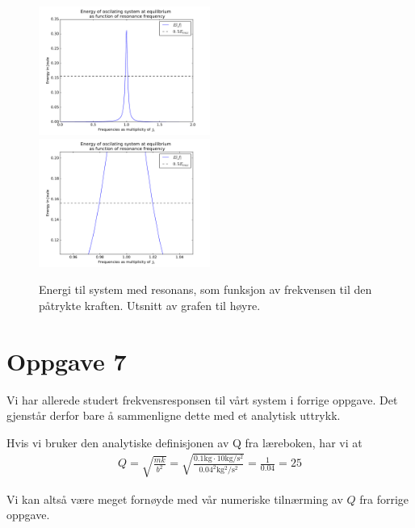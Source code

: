\documentclass[12p,a4paper]{article}
\begin{document}
\begin{figure}[H]
\includegraphics[width=0.5\textwidth]{fig/Frequency.pdf}
\includegraphics[width=0.5\textwidth]{fig/Frequency2.pdf}
\caption{Energi til system med resonans, som funksjon av frekvensen til den påtrykte kraften. Utsnitt av grafen til høyre.}
\label{fig:freq}
\end{figure}



\section*{Oppgave 7}
Vi har allerede studert frekvensresponsen til vårt system i forrige oppgave. Det gjenstår derfor bare å sammenligne dette med et analytisk uttrykk.

Hvis vi bruker den analytiske definisjonen av Q fra læreboken, har vi at
\begin{align*}
Q = \sqrt{\frac{mk}{b^2}} = \sqrt{\frac{0.1\mathrm{kg}\cdot 10\mathrm{kg/s^2}}{0.04^2\mathrm{kg^2/s^2}}} = \frac{1}{0.04} = 25
\end{align*}

Vi kan altså være meget fornøyde med vår numeriske tilnærming av $Q$ fra forrige oppgave.
\end{document}
